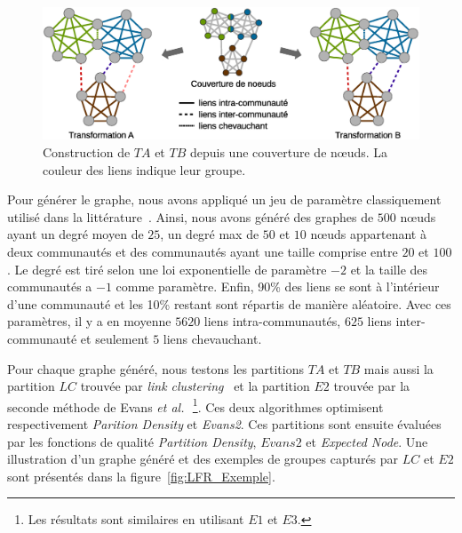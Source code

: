\begin{figure}
\centering
\includegraphics[width=0.9\linewidth]{img/ExpectedNodes/Example/GroundTruthTransformation}
\caption{Construction de $TA$ et $TB$ depuis une couverture de n\oe uds.
La couleur des liens indique leur groupe.}
\label{fig:Trans}
\end{figure}

Pour générer le graphe, nous avons appliqué un jeu de paramètre classiquement utilisé dans la littérature~\cite{Fortunato2010}.
Ainsi, nous avons généré des graphes de $500$ n\oe uds ayant un degré moyen de $25$, un degré max de $50$ et $10$ n\oe uds appartenant à deux communautés et des communautés ayant une taille comprise entre $20$ et $100$.
Le degré est tiré selon une loi exponentielle de paramètre $-2$ et la taille des communautés a $-1$ comme paramètre.
Enfin, 90\% des liens se sont à l'intérieur d'une communauté et les 10\% restant sont répartis de manière aléatoire.
Avec ces paramètres, il y a en moyenne $5620$ liens intra-communautés, $625$ liens inter-communauté et seulement $5$ liens chevauchant.

Pour chaque graphe généré, nous testons les partitions $TA$ et $TB$ mais aussi la partition $LC$ trouvée par \textit{link clustering}~\cite{Ahn2010a} et la partition $E2$ trouvée par la seconde méthode de Evans \textit{et al.}~\cite{Evans2009}\,\footnote{Les résultats sont similaires en utilisant $E1$ et $E3$.}.
Ces deux algorithmes optimisent respectivement \emph{Parition Density} et \emph{Evans2}.
Ces partitions sont ensuite évaluées par les fonctions de qualité \emph{Partition Density}, $Evans2$ et \emph{Expected Node}.
Une illustration d'un graphe généré et des exemples de groupes capturés par $LC$ et $E2$ sont présentés dans la figure~\ref{fig:LFR_Exemple}.

